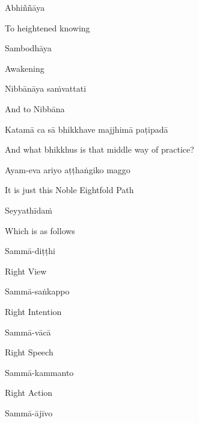 Abhiññāya

\begin{english}
  To heightened knowing
\end{english}

Sambodhāya

\begin{english}
  Awakening
\end{english}

Nibbānāya saṁvattati

\begin{english}
  And to Nibbāna
\end{english}

Katamā ca sā bhikkhave majjhimā paṭipadā

\begin{english}
  And what bhikkhus is that middle way of practice?
\end{english}

Ayam-eva ariyo aṭṭhaṅgiko maggo

\begin{english}
  It is just this Noble Eightfold Path\makeatletter\hyperlink{endnote51-appendix}\makeatother
\end{english}

Seyyathīdaṁ

\begin{english}
  Which is as follows
\end{english}

Sammā-diṭṭhi

\begin{english}
  Right View
\end{english}

Sammā-saṅkappo

\begin{english}
  Right Intention
\end{english}

Sammā-vācā

\begin{english}
  Right Speech
\end{english}

Sammā-kammanto

\begin{english}
  Right Action
\end{english}

Sammā-ājīvo

